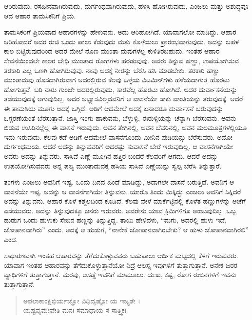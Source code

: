 {\small ಆರಿರುವುದು, ರಸಹೀನವಾಗಿರುವುದು, ದುರ್ಗಂಧವಾಗಿರುವುದು, ಹಳಸಿ ಹೋಗಿರುವುದು, ಎಂಜಲು ಮತ್ತು ಅಶುದ್ಧವೂ ಆದ ಆಹಾರ ತಾಮಸಿಕನಿಗೆ ಪ್ರಿಯ.}

ತಾಮಸಿಕರಿಗೆ ಪ್ರಿಯವಾದ ಆಹಾರಗಳನ್ನು ಹೇಳುವನು. ಅದು ಆರಿಹೋಗಿದೆ. ಯಾವಾಗಲೋ ಮಾಡಿದ್ದು. ಆಹಾರ ಆರಿಹೋದರೆ ಅದರ ರುಚಿ ಒಂದು ಪಾಲು ಕೆಡುವುದು ಮತ್ತು ಕೊಳೆಯಲು ಪ್ರಾರಂಭವಾಗುವುದು. ಅದನ್ನು ಬಹಳ ಕಾಲ ಬಿಟ್ಟಿರುವುದರಿಂದ ಅದರ ಮೇಲೆ ನೊಣ ಮುಂತಾ ದುವುಗಳೆಲ್ಲ ಕುಳಿತಿರಬಹುದು. ಇಂತಹ ಆಹಾರ ಸೇವನೆಯಿಂದಲೇ ಕಾಲರ ಬೇಧಿ ಮುಂತಾದ ರೋಗಗಳು ಹರಡುವುವು. ಅವರು ತಿನ್ನುವ ಹಣ್ಣು, ಉಪಯೋಗಿಸುವ ತರಕಾರಿ ಎಲ್ಲ ಒಣಗಿ ಹೋಗಿರುವುವು. ನಾವು ಅದಕ್ಕೆ ನೀರನ್ನು ಬೆರೆಸಿ ಹಸಿ ಮಾಡಬೇಕು. ತರಕಾರಿ ಹಣ್ಣು ಮುಂತಾದುವು ಹೊಸದಾಗಿರುವಾಗ ಅದರಲ್ಲಿರುವ ಕೆಲವು ಒಳ್ಳೆಯ ವಿಟಮಿನ್​ಗಳು ಹಳೆಯದಾಗುತ್ತ ಹೊರಟು ಹೋಗುತ್ತವೆ. ಬರಿ ನಾರು ಗುಂಜೇ ಅದರಲ್ಲಿರುವುದು, ಸಾರವೆಲ್ಲ ಹೊರಟು ಹೋಗಿದೆ. ಅದರ ದುರ್ವಾಸನೆಯನ್ನು ತಡೆಯುವುದಕ್ಕೆ ಆಗುವುದಿಲ್ಲ. ಅದರ ಅಭ್ಯಾಸವಿಲ್ಲದವನಿಗೆ ಆ ವಾಸನೆಯೇ ಸಾಕು ವಾಂತಿಯನ್ನು ತರುವುದಕ್ಕೆ. ಆದರೆ ಈ ತಾಮಸಿಯ ಮೂಗು ಅದಕ್ಕೆ ಒಗ್ಗಿದೆ. ಅಡಿಗೆ ಆದಮೇಲೆ ಅದಕ್ಕೆ ಏನಾದರೂ ದುರ್ವಾಸನೆ ಬರುವುದನ್ನು ಒಗ್ಗರಣೆಯಂತೆ ಬೆರಸುತ್ತಾನೆ. ಜಾಸ್ತಿ ಇಂಗು ಹಾಕುವನು, ಬೆಳ್ಳುಳ್ಳಿ, ಈರುಳ್ಳಿಯನ್ನು ಚೆನ್ನಾಗಿ ಬೆರಸುವನು. ಅವನು ಬಿಡುವ ಉಸಿರಿನಲ್ಲೆಲ್ಲ ಈ ವಾಸನೆ ಇರುವುದು. ಅವನ ತೇಗಿನಲ್ಲಿ, ಅವನ ಬೆವರಿನಲ್ಲಿ, ಅವನ ಮಲಮೂತ್ರಗಳಲ್ಲಿಯೂ ಇದು ಇರುವುದು. ಕೆಲವು ಕಡೆ ಅಡಿಗೆ ಆದಮೇಲೆ ವಾಸನೆಗೊಂದು ಮೀನಿನ ಪುಡಿಯನ್ನು ಬೆರೆಸುವರು. ಅದೋ ದುರ್ಗಂಧಮಯ. ಆದರೆ ಅದನ್ನು ತಿನ್ನುವವರಿಗೆ ಅದರಷ್ಟು ಸುವಾಸನೆ ಬೇರೆ ಇರುವುದಿಲ್ಲ. ಆ ವಾಸನೆಗಾಗಿಯೇ ಅವರು ಅದನ್ನು ತಿನ್ನುವರು. ಸಾಸಿವೆ ಎಣ್ಣೆ ಮೂಗಿನ ಹತ್ತಿರ ಬಂದರೆ ಕೆಲವರಿಗೆ ಆಗದು. ಆದರೆ ಅದನ್ನು ಉಪಯೋಗಿಸುವವರು ಅನ್ನ ಪಲ್ಯ ಮುಂತಾದುವಕ್ಕೆ ಹಸಿಯ ಸಾಸಿವೆ ಎಣ್ಣೆಯನ್ನು ಸ್ವಲ್ಪ ಬೆರೆಸಿ ತಿನ್ನುತ್ತಾರೆ.

ತಂಗಳು ಎಂಜಲು ಅವನಿಗೆ ಇಷ್ಟ. ಒಂದು ದಿನದ ಹಿಂದೆ ಮಾಡಿದ್ದು, ಅದಾಗಲೇ ವಾಸನೆ ಬರುತ್ತಿದೆ. ಅವನಿಗೆ ಆ ವಾಸನೆಯೇ ಇಷ್ಟ. ಅದನ್ನು ಆ ವಾಸನೆಗಾಗಿಯೇ ತಿನ್ನುವನು. ಯಾರೊ ತಿಂದು ಮಿಕ್ಕಿದ್ದು ಎಂಜಲು ಅವನಿಗೆ ಸಿಕ್ಕಿದರೆ ಅದನ್ನು ತಿನ್ನುವನು. ಆಹಾರ ಕೊಳೆ ಕಶ್ಮಲದಿಂದ ಕೂಡಿದೆ. ಕೆಲವು ವೇಳೆ ಮಾರ್ಕೆಟ್ಟಿನಲ್ಲಿ ಕೊಳೆತ ಹಣ್ಣುಗಳನ್ನು ಆಚೆಗೆ ಎಸೆಯುವರು. ಅದನ್ನು ತಿನ್ನುವುದಕ್ಕೂ ಜನರು ಇರುವರು. ಅವರೇನು ಯಾವ ಕ್ರಿಮಿಗಳಿಗೂ ಅಂಜುವುದಿಲ್ಲ. ಒಬ್ಬ ಹುಡುಗ ಒಂದು ಹುಳುಕು ಸೇಬಿನ ಹಣ್ಣನ್ನು ತಿನ್ನುತ್ತಿದ್ದ. ತಾಯಿ ಹೇಳಿದಳು, “ಮಗು, ಅದರಲ್ಲಿ ಹುಳು ಇದೆ, ಜೋಪಾನವಾಗಿರು” ಎಂದು. ಅದಕ್ಕೆ ಆ ಹುಡುಗ, “ನಾನೇಕೆ ಜೋಪಾನವಾಗಿರಬೇಕು? ಆ ಹುಳು ಜೋಪಾನವಾಗಿರಲಿ” ಎಂದ.

ಸಾಧಾರಣವಾಗಿ ಇಂತಹ ಆಹಾರವನ್ನು ತೆಗೆದುಕೊಳ್ಳುವವರು ಬಹುಪಾಲು ಆರ್ಥಿಕ ಮಟ್ಟದಲ್ಲಿ ಕೆಳಗೆ ಇರುವವರು. ಯಾವಾಗ ಇಂತಹ ಆಹಾರವನ್ನು ತೆಗೆದುಕೊಳ್ಳುತ್ತಾನೆಯೋ ನಿದ್ರೆ ಆಲಸ್ಯ ಇವುಗಳಿಗೆ ತುತ್ತಾಗುತ್ತಾನೆ. ಅನೇಕ ಜಠರ ವ್ಯಾಧಿಗಳಿಗೆ ತುತ್ತಾಗುತ್ತಾನೆ. ಮರವು, ಅಸಡ್ಡೆ ಇವನಿಗೆ ಮಾಮೂಲು. ದುಃಖ, ಕಷ್ಟ, ರೋಗ ರುಜಿನಗಳಿಗೆ ಇವನು ತುತ್ತಾಗುತ್ತಾನೆ.

\begin{verse}
ಅಫಲಾಕಾಂಕ್ಷಿಭಿರ್ಯಜ್ಞೋ ವಿಧಿದೃಷ್ಟೋ ಯ ಇಜ್ಯತೇ ।\\ಯಷ್ಟವ್ಯಮೇವೇತಿ ಮನಃ ಸಮಾಧಾಯ ಸ ಸಾತ್ತ್ವಿಕಃ 
\end{verse}

